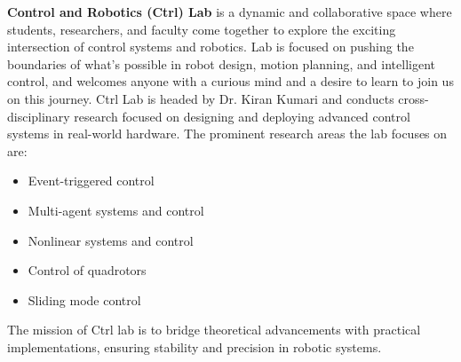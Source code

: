 \noindent \textbf{Control and Robotics (Ctrl) Lab} is a dynamic and collaborative space where students, researchers, and faculty come together to explore the exciting intersection of control systems and robotics. Lab is focused on pushing the boundaries of what's possible in robot design, motion planning, and intelligent control, and welcomes anyone with a curious mind and a desire to learn to join us on this journey. Ctrl Lab is headed by Dr. Kiran Kumari and conducts cross-disciplinary research focused on designing and deploying advanced control systems in real-world hardware. The prominent research areas the lab focuses on are:
\begin{itemize}
    \item Event-triggered control
    \item Multi-agent systems and control
    \item Nonlinear systems and control
    \item Control of quadrotors
    \item Sliding mode control 
\end{itemize}

\noindent The mission of Ctrl lab is to bridge theoretical advancements with practical implementations, ensuring stability and precision in robotic systems. 
